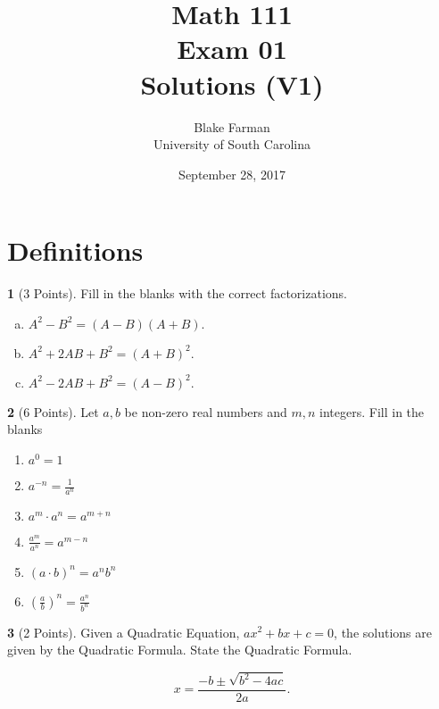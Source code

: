 \documentclass[12pt]{amsart}
\author{Blake Farman\\University of South Carolina}
\title{Math 111\\ Exam 01\\ Solutions (V1)}
\date{September 28, 2017}
\begin{document}
\maketitle

\theoremstyle{definition}
\newtheorem{thm}{}
\newtheorem{defn}{Definition}
\newtheorem*{rmk}{Remark}

\section{Definitions}
\begin{thm}[3 Points]\label{ex1}
  Fill in the blanks with the correct factorizations.
  \begin{enumerate}[(a)]
  \item
    $\displaystyle{A^2 - B^2 = (A - B)(A + B)}.$
    \vspace{.3in}
  \item
    $\displaystyle{A^2 + 2AB + B^2 = (A + B)^2}.$
    \vspace{.3in}
  \item
    $\displaystyle{A^2 - 2AB + B^2 = (A - B)^2}.$
    \vspace{.3in}
  \end{enumerate}
\end{thm}
\vspace{.5in}
\begin{thm}[6 Points]\label{ex2}
  Let $a, b$ be non-zero real numbers and $m, n$ integers.
  Fill in the blanks
  \vspace{.25in}
  \begin{multicols}{2}
    \begin{enumerate}
    \item
      $\displaystyle{a^0 = 1}$
      \vspace{.4in}
    \item
      $\displaystyle{a^{-n} = \frac{1}{a^n}}$
      \vspace{.3in}
    \item
      $\displaystyle{a^m \cdot a^n = a^{m+n}}$
    \item
      $\displaystyle{\frac{a^m}{a^n}= a^{m-n}}$
      \vspace{.25in}
    \item
      $\displaystyle{\left(a \cdot b\right)^n = a^n b^n}$
      \vspace{.25in}
    \item
      $\displaystyle{\left(\frac{a}{b}\right)^n = \frac{a^n}{b^n}}$
    \end{enumerate}
  \end{multicols}
\end{thm}
\newpage
\begin{thm}[2 Points]\label{ex3}
  Given a Quadratic Equation, $ax^2 + bx + c = 0$, the solutions are given by the Quadratic Formula.  State the Quadratic Formula.

  $$x = \frac{-b \pm \sqrt{b^2 - 4ac}}{2a}.$$
\end{thm}
\end{document}
